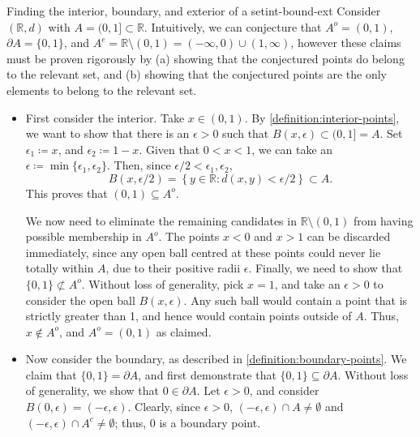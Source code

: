 \documentclass{article}
\numberwithin{equation}{section}
\numberwithin{figure}{section}
\begin{document}
\begin{example}{Finding the interior, boundary, and exterior of a
        set}{int-bound-ext}
    Consider $ (\mathbb{R}, d) $ with $ A = (0, 1] \subset \mathbb{R} $.
    Intuitively, we can conjecture that $ A^o = (0, 1) $, $ \partial A = \{0,
    1\} $, and $ A^e = \mathbb{R} \setminus (0, 1) = (-\infty, 0) \cup (1,
    \infty) $, however these claims must be proven rigorously by (a) showing
    that the conjectured points do belong to the relevant set, and (b) showing
    that the conjectured points are the only elements to belong to the relevant
    set.
    \begin{itemize}
        \item First consider the interior. Take $ x \in (0, 1) $. By
            \cref{definition:interior-points}, we want to show that there is an
            $ \epsilon > 0 $ such that $ B(x, \epsilon) \subset (0, 1] = A $.
            Set $ \epsilon_1 \coloneq x $, and $ \epsilon_2 \coloneq 1-x $.
            Given that $ 0 < x < 1 $, we can take an $ \epsilon \coloneq
            \min\{ \epsilon_1, \epsilon_2 \} $. Then, since $ \epsilon/2 <
            \epsilon_1, \epsilon_2 $,
            \begin{equation}
                B(x, \epsilon/2) = \left\{ y \in \mathbb{R} \colon d(x, y) <
                    \epsilon/2 \right\} \subset A.
            \end{equation}
            This proves that $ (0, 1) \subseteq A^o $.

            We now need to eliminate the remaining candidates in $ \mathbb{R}
            \setminus (0, 1) $ from having possible membership in $ A^o $. The
            points $ x < 0 $ and $ x > 1 $ can be discarded immediately, since
            any open ball centred at these points could never lie totally within
            $ A $, due to their positive radii $ \epsilon $. Finally, we need to
            show that $ \{0,1\} \not\subset A^o $. Without loss of generality,
            pick $ x = 1 $, and take an $ \epsilon > 0 $ to consider the open
            ball $ B(x, \epsilon) $. Any such ball would contain a point that is
            strictly greater than 1, and hence would contain points outside of $
            A $. Thus, $ x \not\in A^o $, and $ A^o = (0, 1) $ as claimed.
        \item Now consider the boundary, as described in
            \cref{definition:boundary-points}. We claim that $ \{0, 1\} =
            \partial A $, and first demonstrate that $ \{0, 1\} \subseteq
            \partial A $.  Without loss of generality, we show that $ 0 \in
            \partial A $. Let $ \epsilon > 0 $, and consider $ B(0, \epsilon) =
            (-\epsilon, \epsilon) $. Clearly, since $ \epsilon > 0 $, $
            (-\epsilon, \epsilon) \cap A \neq \emptyset $ and $ (-\epsilon,
            \epsilon) \cap A^c \neq \emptyset $; thus, $ 0 $ is a boundary
            point.


\end{itemize}
\end{example}
\end{document}
